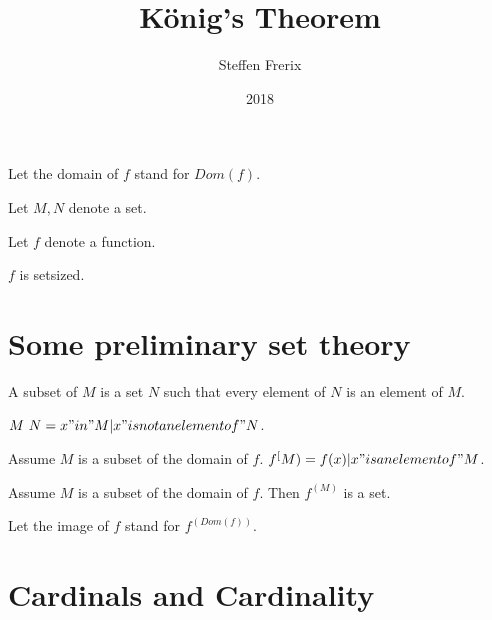 \documentclass{document}
\title{König's Theorem}
\author{Steffen Frerix}
\date{2018}
\begin{document}

  \maketitle

  \begin{forthel}

    Let the domain of $f$ stand for $Dom(f)$.

    Let $M,N$ denote a set.

    Let $f$ denote a function.
    \begin{axiom}
      $f$ is setsized.
    \end{axiom}
  \end{forthel}


  \section*{Some preliminary set theory}

  \begin{forthel}
    \begin{definition}
      A subset of $M$ is a set $N$ such that every element of $N$ is an element of $M$.
    \end{definition}

    \begin{definition}
      $M \ N = {x "in" M | x "is not an element of" N}$.
    \end{definition}

    \begin{definition}
      Assume $M$ is a subset of the domain of $f$. $f^[M) = {f(x) | x "is an element of" M}$.
    \end{definition}

    \begin{axiom}
      Assume $M$ is a subset of the domain of $f$. Then $f^(M)$ is a set.
    \end{axiom}

    Let the image of $f$ stand for $f^(Dom(f))$.
  \end{forthel}


  \section*{Cardinals and Cardinality}
\end{document}
